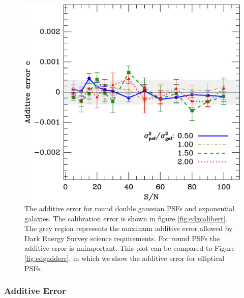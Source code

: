 \documentclass[10pt,preprint]{aastex}
\newcommand{\psf}{PSF}
\begin{document}
\begin{figure}[t] \centering
 \centering 
 \includegraphics[scale=0.65]{figures/set-s2n-edg02-c-vs-shear.eps}

 \caption{The additive error for round double gaussian \psf s and exponential
 galaxies.  The calibration error is shown in figure \ref{fig:edgcaliberr}.
 The grey region represents the maximum additive error allowed by Dark Energy
 Survey science requirements.  For round \psf s the additive error is
 unimportant.  This plot can be compared to Figure \ref{fig:edgadderr},
 in which we show the additive error for elliptical \psf s.  } 

 \label{fig:edgverifyadditive}
\end{figure}


\subsubsection{Additive Error}
\end{document}
